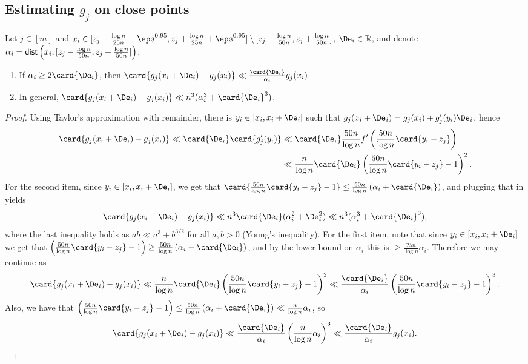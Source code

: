\subsection{Estimating $g_j$ on close points}
\begin{fact}\label{fact:first_order_g}
Let $j\in[m]$ and
$x_i\in [z_j - \frac{\log n}{25 n}-\eps^{0.95},z_j+\frac{\log n}{25 n}+\eps^{0.95}]\setminus [z_j - \frac{\log n}{50 n},z_j+\frac{\log n}{50 n}]$,
$\De_i\in\mathbb{R}$, and denote
$\alpha_i = {\sf dist}\left(x_i, [z_j - \frac{\log n}{50 n}, z_j+\frac{\log n}{50n}]\right)$.

\begin{enumerate}
  \item If $\alpha_i\geq 2\card{\De_i}$, then $\card{g_j(x_i+\De_i) - g_j(x_i)}\ll \frac{\card{\De_i}}{\alpha_i} g_j(x_i)$.
  \item In general, $\card{g_j(x_i+\De_i) - g_j(x_i)}\ll n^3(\alpha_i^3+\card{\De_i}^3)$.
\end{enumerate}

\end{fact}
\begin{proof}
     Using
     Taylor's approximation with remainder, there is $y_i\in [x_i,x_i + \De_i]$ such that
     $g_j(x_i+\De_i) = g_j(x_i) + g_j'(y_i)\De_i$, hence
     \begin{align*}
     \card{g_j(x_i+\De_i) - g_j(x_i)}
     \ll \card{\De_i} \card{g_j'(y_i)}
     &\ll \card{\De_i}\frac{50n}{\log n}f'\left(\frac{50n}{\log n}\card{y_i-z_j}\right)\\
     &\ll \frac{n}{\log n} \card{\De_i} \left(\frac{50n}{\log n}\card{y_i-z_j}-1\right)^2.
     \end{align*}
     For the second item, since $y_i\in [x_i,x_i+\De_i]$,
     we get that $\card{\frac{50n}{\log n}\card{y_i-z_j}-1}\leq \frac{50n}{\log n}\left(\alpha_i + \card{\De_i}\right)$,
     and plugging that in yields
     \[
     \card{g_j(x_i+\De_i) - g_j(x_i)}
     \ll n^3\card{\De_i}(\alpha_i^2 + \De_i^2)
     \ll n^3(\alpha_i^3+\card{\De_i}^3),
     \]
     where the last inequality holds as $ab\ll a^3 + b^{3/2}$ for all $a,b>0$ (Young's inequality).
     For the first item, note that since $y_i\in [x_i,x_i+\De_i]$ we get that
     $\left(\frac{50n}{\log n}\card{y_i-z_j}-1\right)\geq \frac{50n}{\log n}\left(\alpha_i - \card{\De_i}\right)$,
     and by the lower bound on $\alpha_i$ this is $\geq \frac{25n}{\log n}\alpha_i$. Therefore we may continue
     as
     \[
     \card{g_j(x_i+\De_i) - g_j(x_i)}
     \ll \frac{n}{\log n} \card{\De_i} \left(\frac{50n}{\log n}\card{y_i-z_j}-1\right)^2
     \ll \frac{\card{\De_i}}{\alpha_i}\left(\frac{50n}{\log n}\card{y_i-z_j}-1\right)^3.
     \]
     Also, we have that
     $\left(\frac{50n}{\log n}\card{y_i-z_j}-1\right)\leq \frac{50n}{\log n}\left(\alpha_i + \card{\De_i}\right)
     \ll \frac{n}{\log n} \alpha_i$, so
     \[
     \card{g_j(x_i+\De_i) - g_j(x_i)}
     \ll \frac{\card{\De_i}}{\alpha_i}\left(\frac{n}{\log n} \alpha_i\right)^3
     \ll \frac{\card{\De_i}}{\alpha_i}g_j(x_i).\qedhere
     \]

\end{proof}
